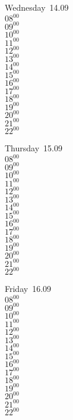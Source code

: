 \documentclass[11pt,a4paper]{book}\usepackage[]{graphicx}\usepackage[]{color}
\begin{document}
\begin{weekdaybox}
  Wednesday~14.09\\
  { 
  \vfill
  $08^{00}$\\
$09^{00}$\\
$10^{00}$\\
$11^{00}$\\
$12^{00}$\\
$13^{00}$\\
$14^{00}$\\
$15^{00}$\\
$16^{00}$\\
$17^{00}$\\
$18^{00}$\\
$19^{00}$\\
$20^{00}$\\
$21^{00}$\\
$22^{00}$\\
  }
\end{weekdaybox}
\clearpage
\begin{headerbox}
\end{headerbox}
\begin{weekdaybox}
  Thursday~15.09\\
  { 
  \vfill
  $08^{00}$\\
$09^{00}$\\
$10^{00}$\\
$11^{00}$\\
$12^{00}$\\
$13^{00}$\\
$14^{00}$\\
$15^{00}$\\
$16^{00}$\\
$17^{00}$\\
$18^{00}$\\
$19^{00}$\\
$20^{00}$\\
$21^{00}$\\
$22^{00}$\\
  }
\end{weekdaybox} 
\begin{weekdaybox}
  Friday~16.09\\
  { 
  \vfill
  $08^{00}$\\
$09^{00}$\\
$10^{00}$\\
$11^{00}$\\
$12^{00}$\\
$13^{00}$\\
$14^{00}$\\
$15^{00}$\\
$16^{00}$\\
$17^{00}$\\
$18^{00}$\\
$19^{00}$\\
$20^{00}$\\
$21^{00}$\\
$22^{00}$\\
  }
\end{weekdaybox}
\end{document}
